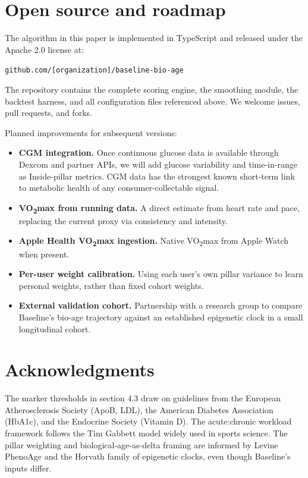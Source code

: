 \documentclass[11pt, a4paper]{article}
\begin{document}
\section{Open source and roadmap}

The algorithm in this paper is implemented in TypeScript and released under the Apache 2.0 license at:

\begin{center}
\texttt{github.com/[organization]/baseline-bio-age}
\end{center}

The repository contains the complete scoring engine, the smoothing module, the backtest harness, and all configuration files referenced above. We welcome issues, pull requests, and forks.

Planned improvements for subsequent versions:

\begin{itemize}
  \item \textbf{CGM integration.} Once continuous glucose data is available through Dexcom and partner APIs, we will add glucose variability and time-in-range as Inside-pillar metrics. CGM data has the strongest known short-term link to metabolic health of any consumer-collectable signal.
  \item \textbf{VO\textsubscript{2}max from running data.} A direct estimate from heart rate and pace, replacing the current proxy via consistency and intensity.
  \item \textbf{Apple Health VO\textsubscript{2}max ingestion.} Native VO\textsubscript{2}max from Apple Watch when present.
  \item \textbf{Per-user weight calibration.} Using each user's own pillar variance to learn personal weights, rather than fixed cohort weights.
  \item \textbf{External validation cohort.} Partnership with a research group to compare Baseline's bio-age trajectory against an established epigenetic clock in a small longitudinal cohort.
\end{itemize}

\section{Acknowledgments}

The marker thresholds in section 4.3 draw on guidelines from the European Atherosclerosis Society (ApoB, LDL), the American Diabetes Association (HbA1c), and the Endocrine Society (Vitamin D). The acute:chronic workload framework follows the Tim Gabbett model widely used in sports science. The pillar weighting and biological-age-as-delta framing are informed by Levine PhenoAge and the Horvath family of epigenetic clocks, even though Baseline's inputs differ.
\end{document}

